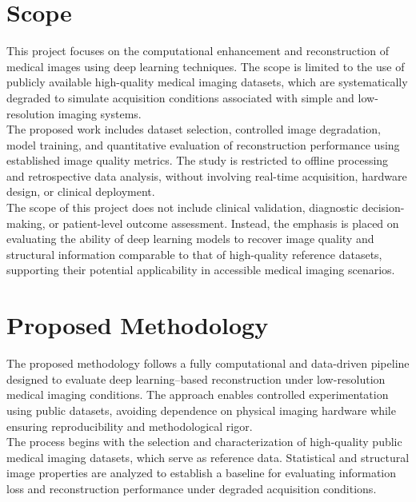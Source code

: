 \documentclass[12pt,letterpaper]{article}     %
\begin{document}
\section{Scope}

\noindent This project focuses on the computational enhancement and reconstruction of medical images using deep learning techniques. The scope is limited to the use of publicly available high-quality medical imaging datasets, which are systematically degraded to simulate acquisition conditions associated with simple and low-resolution imaging systems.\\

\noindent The proposed work includes dataset selection, controlled image degradation, model training, and quantitative evaluation of reconstruction performance using established image quality metrics. The study is restricted to offline processing and retrospective data analysis, without involving real-time acquisition, hardware design, or clinical deployment.\\

\noindent The scope of this project does not include clinical validation, diagnostic decision-making, or patient-level outcome assessment. Instead, the emphasis is placed on evaluating the ability of deep learning models to recover image quality and structural information comparable to that of high-quality reference datasets, supporting their potential applicability in accessible medical imaging scenarios.\\


\section{Proposed Methodology}

\noindent The proposed methodology follows a fully computational and data-driven pipeline designed to evaluate deep learning–based reconstruction under low-resolution medical imaging conditions. The approach enables controlled experimentation using public datasets, avoiding dependence on physical imaging hardware while ensuring reproducibility and methodological rigor.\\

\noindent The process begins with the selection and characterization of high-quality public medical imaging datasets, which serve as reference data. Statistical and structural image properties are analyzed to establish a baseline for evaluating information loss and reconstruction performance under degraded acquisition conditions.\\
\end{document}
